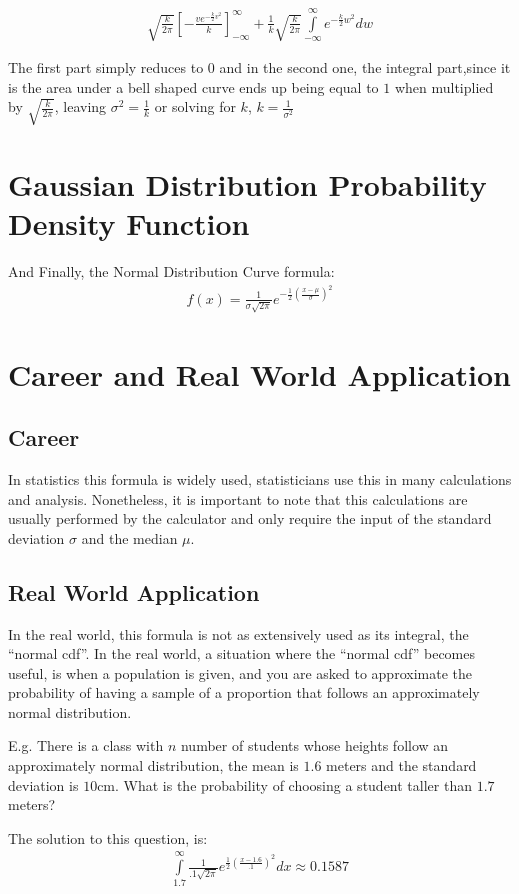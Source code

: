 \documentclass{article}
\begin{document}
\begin{align}
  \sqrt{\frac{k}{2\pi}}\left[ -\frac{ve^{-\frac{k}{2}v^2}}{k} \right] _{-\infty}^{\infty}
  + \frac{1}{k}\sqrt{\frac{k}{2\pi}}\int\limits_{-\infty}^{\infty}e^{-\frac{k}{2}w^2}dw
\end{align}

The first part simply reduces to $0$ and in the second one, the integral
part,since it is the area under a bell shaped curve ends up being equal to $1$
when multiplied by $\sqrt{\frac{k}{2\pi}}$, leaving $\sigma^2=\frac{1}{k}$ or
solving for $k$, $k=\frac{1}{\sigma^2}$

\section{Gaussian Distribution Probability Density Function}

And Finally, the Normal Distribution Curve formula:
\begin{align}
  \label{eq:pdf}
  f(x)=\frac{1}{\sigma\sqrt{2\pi}}e^{-\frac{1}{2}\left( \frac{x-\mu}{\sigma} \right)^2}
\end{align}

\section{Career and Real World Application}
\subsection{Career}
In statistics this formula is widely used, statisticians use this in many
calculations and analysis. Nonetheless, it is important to note that this
calculations are usually performed by the calculator and only require the input
of the standard deviation $\sigma$ and the median $\mu$.
\subsection{Real World Application}
In the real world, this formula is not as extensively used as its integral, the
``normal cdf''. In the real world, a situation where the ``normal cdf'' becomes
useful, is when a population is given, and you are asked to approximate the
probability of having a sample of a proportion that follows an approximately
normal distribution.

E.g. There is a class with $n$ number of students whose heights follow an
approximately normal distribution, the mean is $1.6$ meters and the standard
deviation is $10$cm. What is the probability of choosing a student taller than
$1.7$ meters?

The solution to this question, is:
\begin{align*}
  \int\limits_{1.7}^{\infty}\frac{1}{.1\sqrt{2\pi}}e^{\frac{1}{2}\left( \frac{x-1.6}{.1} \right)^2}dx\approx 0.1587
\end{align*}
\end{document}
